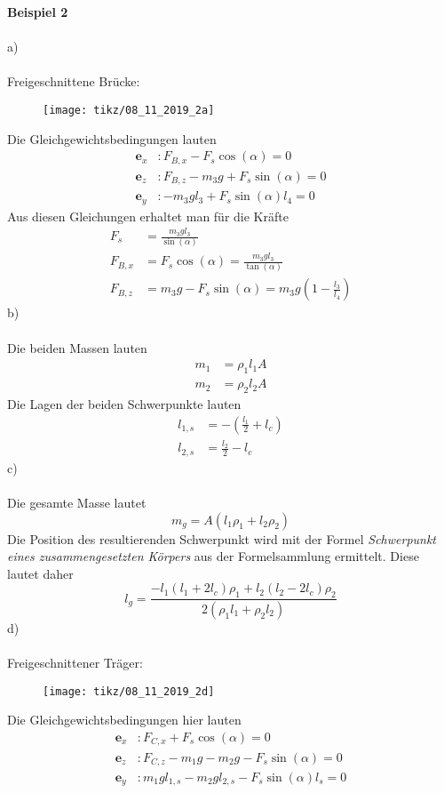 \textbf{Beispiel 2}\\ \\
a) \\ \\
Freigeschnittene Brücke:
\begin{figure}[h]
	\centering
	\texttt{[image: tikz/08\_11\_2019\_2a]}
\end{figure}
Die Gleichgewichtsbedingungen lauten
\begin{align*}
	\textbf{e}_x &:  F_{B,x} - F_s\cos(\alpha) = 0\\
	\textbf{e}_z &: F_{B,z} - m_3g + F_s\sin(\alpha) = 0\\
	\textbf{e}_y &: -m_3gl_3 + F_s\sin(\alpha)l_4 = 0
\end{align*}
\newpage
\noindent
Aus diesen Gleichungen erhaltet man für die Kräfte
\begin{align*}
	F_s &= \frac{m_3gl_3}{\sin(\alpha)} \\
	F_{B,x} &= F_s\cos(\alpha) = \frac{m_3gl_3}{\tan(\alpha)} \\
	F_{B,z} &= m_3g - F_s\sin(\alpha) = m_3g\left(1 - \frac{l_3}{l_4}\right)
\end{align*}
b)\\ \\
Die beiden Massen lauten
\begin{align*}
	m_1 &= \rho_1 l_1A \\
	m_2 &= \rho_2 l_2A
\end{align*}
Die Lagen der beiden Schwerpunkte lauten
\begin{align*}
	l_{1,s} &= -\left(\frac{l_1}{2} + l_c\right) \\
	l_{2,s} &= \frac{l_2}{2} - l_c
\end{align*}
c) \\ \\
Die gesamte Masse lautet
\[
	m_g = A(l_1\rho_1 + l_2\rho_2)
\]
Die Position des resultierenden Schwerpunkt wird mit der Formel \textit{Schwerpunkt eines zusammengesetzten Körpers} aus der Formelsammlung ermittelt. Diese lautet daher
\[
	l_g = \frac{-l_1(l_1 + 2l_c)\rho_1 + l_2(l_2 - 2l_c)\rho_2}{2(\rho_1l_1 + \rho_2l_2)}
\]
d)\\ \\
Freigeschnittener Träger:
\begin{figure}[h]
	\centering
	\texttt{[image: tikz/08\_11\_2019\_2d]}
\end{figure}
\newpage
\noindent
Die Gleichgewichtsbedingungen hier lauten
\begin{align*}
	\textbf{e}_x &: F_{C,x} + F_s\cos(\alpha) = 0\\
	\textbf{e}_z &: F_{C,z} - m_1g - m_2g - F_s\sin(\alpha) = 0\\ 
	\textbf{e}_y &: m_1gl_{1,s} - m_2gl_{2,s} - F_s\sin(\alpha)l_s = 0
\end{align*}
